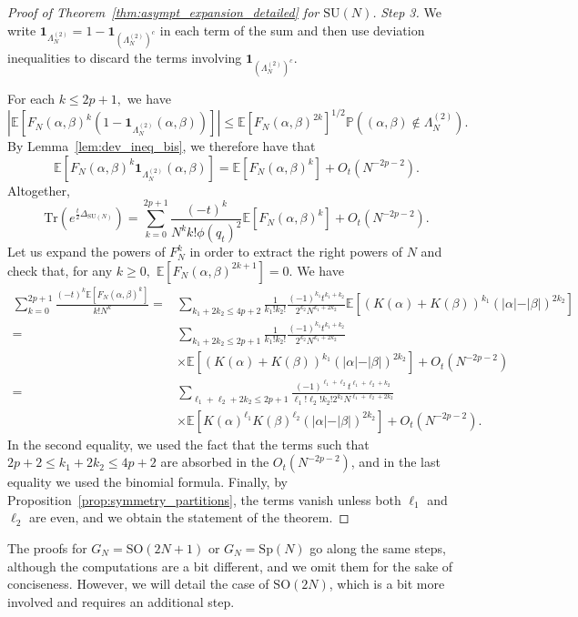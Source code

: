 \documentclass[11pt,a4paper,reqno]{article}
\theoremstyle{definition}
\theoremstyle{remark}
\newcommand\SU{{\mathrm{SU}}}
\newcommand\SO{{\mathrm{SO}}}
\newcommand\Sp{{\mathrm{Sp}}}
\newcommand\Tr{\mathrm{Tr}}
\newcommand\Pbb{\mathbb{P}}
\newcommand\E{\mathbb{E}}
\begin{document}
\begin{proof}[Proof of Theorem~\ref{thm:asympt_expansion_detailed} for $\SU(N)$]
\emph{Step 3.} We write $\mathbf{1}_{\Lambda_N^{(2)}} = 1 - \mathbf{1}_{(\Lambda_N^{(2)})^c}$ in each term of the sum and then use deviation inequalities to discard the terms involving $\mathbf{1}_{(\Lambda_N^{(2)})^c}.$


For each $k \leq2p+1,$  we have
\[
\left\vert\E[F_{N}(\alpha,\beta)^k(1-\mathbf{1}_{\Lambda_N^{(2)}}(\alpha,\beta))]\right\vert\leq \E[F_{N}(\alpha, \beta)^{2k}]^{1/2}   \Pbb((\alpha,\beta)\notin\Lambda_N^{(2)}).
\]
By Lemma~\ref{lem:dev_ineq_bis}, we therefore have that
\[
\E[F_{N}(\alpha,\beta)^k\mathbf{1}_{\Lambda_N^{(2)}}(\alpha,\beta)]=\E[F_{N}(\alpha,\beta)^k]+O_t(N^{-2p-2}).
\]
Altogether,
\[
\Tr(e^{\frac{t}{2}\Delta_{\SU(N)}})=\sum_{k=0}^{2p+1}\frac{ (-t)^k  }{N^k k!\phi(q_t)^2}  \E[F_{N}(\alpha,\beta)^k]+O_t(N^{-2p-2}).
\]
Let us expand the powers of $F_{N}^k$ in order to extract the right powers of $N$ and check that, for any $k\geq 0,$ $\E[F_{N}(\alpha,\beta)^{2k+1}] =0.$ We have
\begin{align*}
\sum_{k=0}^{2p+1}\frac{(-t)^k\E[F_{N}(\alpha,\beta)^k]}{k!N^k}= &  \sum_{k_1+ 2k_2\leq 4p+2} \frac{1}{k_1!k_2!}\frac{(-1)^{k_1}t^{k_1+k_2}}{2^{k_2}N^{k_1+2k_2}}\E[(K(\alpha)+K(\beta))^{k_1}(\vert\alpha\vert-\vert\beta\vert)^{2k_2}]\\
= & \sum_{k_1+2k_2\leq 2p+1}\frac{1}{k_1!k_2!}\frac{(-1)^{k_1}t^{k_1+k_2}}{2^{k_2}N^{k_1+2k_2}}\\
&\times \E[(K(\alpha)+K(\beta))^{k_1}(\vert\alpha\vert-\vert\beta\vert)^{2k_2}] + O_t(N^{-2p-2})\\
= & \sum_{\ell_1+\ell_2+2k_2\leq 2p+1}\frac{(-1)^{\ell_1+\ell_2}t^{\ell_1+\ell_2+k_2}}{\ell_1!\ell_2!k_2!2^{k_2}N^{\ell_1+\ell_2+2k_2}}\\
&\times \E[K(\alpha)^{\ell_1}K(\beta)^{\ell_2}(\vert\alpha\vert-\vert\beta\vert)^{2k_2}]+O_t(N^{-2p-2}).
\end{align*}
In the second equality, we used the fact that the terms such that $2p+2 \leq k_1+2k_2 \leq4p+2$ are absorbed in the $O_t(N^{-2p-2})$, and in the last equality we used the binomial formula. Finally, by Proposition~\ref{prop:symmetry_partitions}, the terms vanish unless both $\ell_1$ and $\ell_2$ are even, and we obtain the statement of the theorem.
\end{proof}

The proofs for $G_N=\SO(2N+1)$ or $G_N=\Sp(N)$ go along the same steps, although the computations are a bit different, and we omit them for the sake of conciseness. However, we will detail the case of $\SO(2N)$, which is a bit more involved and requires an additional step.
\end{document}
